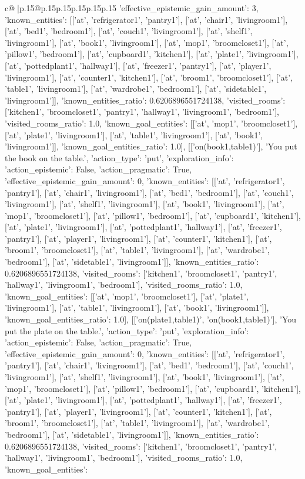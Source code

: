 \documentclass{article}
\begin{document}
{\begin{supertabular}{c@{$\;$}|p{.15\linewidth}@{}p{.15\linewidth}p{.15\linewidth}p{.15\linewidth}p{.15\linewidth}p{.15\linewidth}}
{{{'effective_epistemic_gain_amount': 3, 'known_entities': [['at', 'refrigerator1', 'pantry1'], ['at', 'chair1', 'livingroom1'], ['at', 'bed1', 'bedroom1'], ['at', 'couch1', 'livingroom1'], ['at', 'shelf1', 'livingroom1'], ['at', 'book1', 'livingroom1'], ['at', 'mop1', 'broomcloset1'], ['at', 'pillow1', 'bedroom1'], ['at', 'cupboard1', 'kitchen1'], ['at', 'plate1', 'livingroom1'], ['at', 'pottedplant1', 'hallway1'], ['at', 'freezer1', 'pantry1'], ['at', 'player1', 'livingroom1'], ['at', 'counter1', 'kitchen1'], ['at', 'broom1', 'broomcloset1'], ['at', 'table1', 'livingroom1'], ['at', 'wardrobe1', 'bedroom1'], ['at', 'sidetable1', 'livingroom1']], 'known_entities_ratio': 0.6206896551724138, 'visited_rooms': ['kitchen1', 'broomcloset1', 'pantry1', 'hallway1', 'livingroom1', 'bedroom1'], 'visited_rooms_ratio': 1.0, 'known_goal_entities': [['at', 'mop1', 'broomcloset1'], ['at', 'plate1', 'livingroom1'], ['at', 'table1', 'livingroom1'], ['at', 'book1', 'livingroom1']], 'known_goal_entities_ratio': 1.0}}], [['on(book1,table1)'], 'You put the book on the table.', {'action_type': 'put', 'exploration_info': {'action_epistemic': False, 'action_pragmatic': True, 'effective_epistemic_gain_amount': 0, 'known_entities': [['at', 'refrigerator1', 'pantry1'], ['at', 'chair1', 'livingroom1'], ['at', 'bed1', 'bedroom1'], ['at', 'couch1', 'livingroom1'], ['at', 'shelf1', 'livingroom1'], ['at', 'book1', 'livingroom1'], ['at', 'mop1', 'broomcloset1'], ['at', 'pillow1', 'bedroom1'], ['at', 'cupboard1', 'kitchen1'], ['at', 'plate1', 'livingroom1'], ['at', 'pottedplant1', 'hallway1'], ['at', 'freezer1', 'pantry1'], ['at', 'player1', 'livingroom1'], ['at', 'counter1', 'kitchen1'], ['at', 'broom1', 'broomcloset1'], ['at', 'table1', 'livingroom1'], ['at', 'wardrobe1', 'bedroom1'], ['at', 'sidetable1', 'livingroom1']], 'known_entities_ratio': 0.6206896551724138, 'visited_rooms': ['kitchen1', 'broomcloset1', 'pantry1', 'hallway1', 'livingroom1', 'bedroom1'], 'visited_rooms_ratio': 1.0, 'known_goal_entities': [['at', 'mop1', 'broomcloset1'], ['at', 'plate1', 'livingroom1'], ['at', 'table1', 'livingroom1'], ['at', 'book1', 'livingroom1']], 'known_goal_entities_ratio': 1.0}}], [['on(plate1,table1)', 'on(book1,table1)'], 'You put the plate on the table.', {'action_type': 'put', 'exploration_info': {'action_epistemic': False, 'action_pragmatic': True, 'effective_epistemic_gain_amount': 0, 'known_entities': [['at', 'refrigerator1', 'pantry1'], ['at', 'chair1', 'livingroom1'], ['at', 'bed1', 'bedroom1'], ['at', 'couch1', 'livingroom1'], ['at', 'shelf1', 'livingroom1'], ['at', 'book1', 'livingroom1'], ['at', 'mop1', 'broomcloset1'], ['at', 'pillow1', 'bedroom1'], ['at', 'cupboard1', 'kitchen1'], ['at', 'plate1', 'livingroom1'], ['at', 'pottedplant1', 'hallway1'], ['at', 'freezer1', 'pantry1'], ['at', 'player1', 'livingroom1'], ['at', 'counter1', 'kitchen1'], ['at', 'broom1', 'broomcloset1'], ['at', 'table1', 'livingroom1'], ['at', 'wardrobe1', 'bedroom1'], ['at', 'sidetable1', 'livingroom1']], 'known_entities_ratio': 0.6206896551724138, 'visited_rooms': ['kitchen1', 'broomcloset1', 'pantry1', 'hallway1', 'livingroom1', 'bedroom1'], 'visited_rooms_ratio': 1.0, 'known_goal_entities': }}}
\end{supertabular}}
\end{document}
